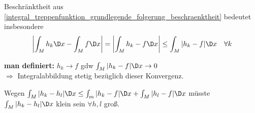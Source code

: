 	Beschränktheit aus  \ref{integral_treppenfunktion_grundlegende_folgerung_beschraenktheit} bedeutet insbesondere \begin{align*}
		\left\vert \int_M h_k\D x - \int_M f \D x \right\vert = \left\vert \int_M h_k - f \D x \right\vert \le \int_M \vert h_k - f\vert \D x \quad\forall k
	\end{align*}
	
\textbf{man definiert:} $h_k\to f$ \gls{gdw} $\int_M \vert h_k - f\vert \D x\to 0$\\
	$\Rightarrow$ Integralabbildung stetig bezüglich dieser Konvergenz.
	
	Wegen $\int_M \vert h_k - h_l\vert \D x \le \int_m \vert h_k - f\vert \D x + \int_M \vert h_l -f \vert \D x$ müsste $\int_M \vert h_k - h_l\vert \D x$ klein sein $\forall h,l$ groß.

